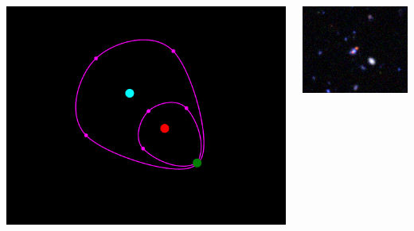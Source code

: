 \documentclass[aspectratio=1610]{beamer}
\begin{document}
\begin{frame}
  \begin{columns}[T]
    \begin{column}{5.5cm}
      \includegraphics[width=\textwidth]{imgs/sl-3}
    \end{column}
    \begin{column}{5.5cm}
      \includegraphics[width=\textwidth]{imgs/real3}
    \end{column}
  \end{columns}
\end{frame}
\end{document}
